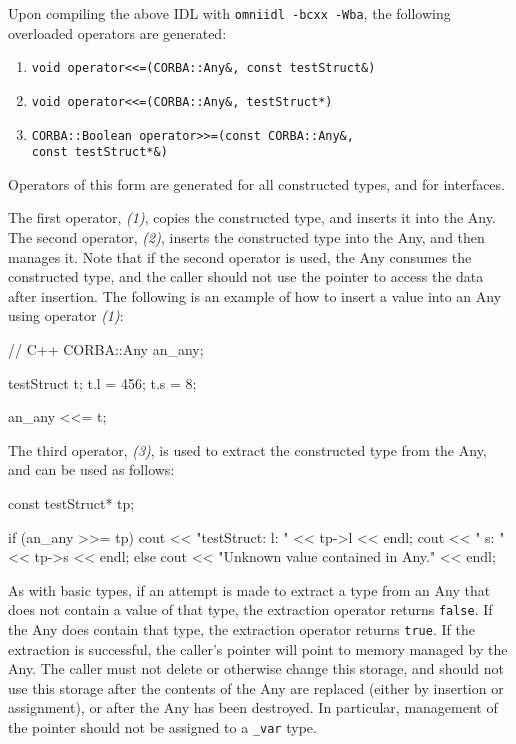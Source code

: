 \documentclass[11pt,oneside,a4paper]{book}
\newcommand{\type}[1]{\texttt{#1}}
\newcommand{\code}[1]{\texttt{#1}}
\begin{document}
Upon compiling the above IDL with \texttt{omniidl -bcxx -Wba}, the
following overloaded operators are generated:

\begin{enumerate}
\item \verb|void operator<<=(CORBA::Any&, const testStruct&)|
\item \verb|void operator<<=(CORBA::Any&, testStruct*)|
\item \verb|CORBA::Boolean operator>>=(const CORBA::Any&,|\\
      \verb|const testStruct*&)|
\end{enumerate}

Operators of this form are generated for all constructed types, and
for interfaces.

The first operator, \emph{(1)}, copies the constructed type, and
inserts it into the Any. The second operator, \emph{(2)}, inserts the
constructed type into the Any, and then manages it. Note that if the
second operator is used, the Any consumes the constructed type, and
the caller should not use the pointer to access the data after
insertion. The following is an example of how to insert a value into
an Any using operator \emph{(1)}:

\begin{cxxlisting}
// C++
CORBA::Any an_any;

testStruct t;
t.l = 456;
t.s = 8;

an_any <<= t;
\end{cxxlisting}


The third operator, \emph{(3)}, is used to extract the constructed
type from the Any, and can be used as follows:

\begin{cxxlisting}
const testStruct* tp;

if (an_any >>= tp) {
    cout << "testStruct: l: " << tp->l << endl;
    cout << "            s: " << tp->s << endl;
}
else {
    cout << "Unknown value contained in Any." << endl;
}
\end{cxxlisting}

As with basic types, if an attempt is made to extract a type from an
Any that does not contain a value of that type, the extraction
operator returns \code{false}. If the Any does contain that type, the
extraction operator returns \code{true}. If the extraction is
successful, the caller's pointer will point to memory managed by the
Any. The caller must not delete or otherwise change this storage, and
should not use this storage after the contents of the Any are replaced
(either by insertion or assignment), or after the Any has been
destroyed. In particular, management of the pointer should not be
assigned to a \type{\_var} type.
\end{document}

